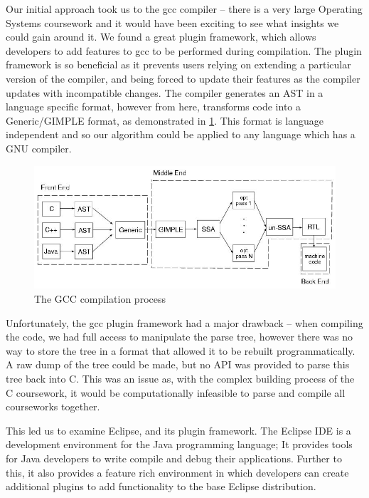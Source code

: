 Our initial approach took us to the gcc compiler -- there is a very large
Operating Systems coursework and it would have been exciting to see what insights
we could gain around it. We found a great plugin framework\cite{gccPlugin}, which
allows developers to add features to gcc to be performed during compilation. The
plugin framework is so beneficial as it prevents users relying on extending
a particular version of the compiler, and being forced to update their features
as the compiler updates with incompatible changes. The compiler generates an
AST in a language specific format, however from here, transforms code into a
Generic/GIMPLE format, as demonstrated in \cref{fig:gccFlow}. This format is
language independent and so our algorithm could be applied to any language
which has a GNU compiler.
\begin{figure}[H]
	\centering
		\includegraphics[width=\textwidth]{Figures/GCCFlow}
	\caption{The GCC compilation process \cite{gccFlow}}
	\label{fig:gccFlow}
\end{figure}

Unfortunately, the gcc plugin framework had a major drawback -- when compiling
the code, we had full access to manipulate the parse tree, however there was
no way to store the tree in a format that allowed it to be rebuilt 
programmatically. A raw dump of the tree could be made, but no API was 
provided to parse this tree back into C. This was an issue as, with the complex
building process of the C coursework, it would be computationally infeasible
to parse and compile all courseworks together.

This led us to examine Eclipse, and its plugin framework.
The Eclipse IDE is a development environment for the Java programming language;
It provides tools for Java developers to write compile and debug their applications.
Further to this, it also provides a feature rich environment in which developers
can create additional plugins to add functionality to the base Eclipse distribution.


